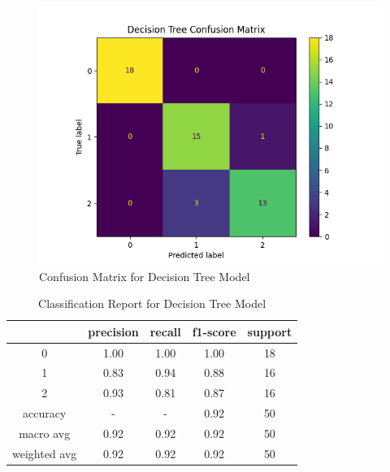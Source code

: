 \documentclass[journal]{IEEEtran}
\begin{document}
\begin{figure}[h!]
\includegraphics[scale=.5]{dtree_cm.png}
\centering
\caption{Confusion Matrix for Decision Tree Model}
\label{fig:cm-dtree}
\end{figure}

\begin{table}[h!]
\centering
\begin{tabular}{ c | c c c c }
& precision   & recall & f1-score  & support \\
\hline
0   &    1.00  &    1.00   &   1.00  &      18 \\
1   &    0.83  &    0.94   &   0.88  &      16 \\
2   &    0.93  &    0.81   &   0.87  &      16 \\
\hline
accuracy    &     -     &     -    &    0.92    &    50 \\
macro avg    &   0.92   &   0.92   &   0.92    &    50 \\
weighted avg   &    0.92  &    0.92   &   0.92   &     50 \\
\end{tabular}
\caption{Classification Report for Decision Tree Model}
\label{table:classReport-dtree}
\end{table}
\end{document}
